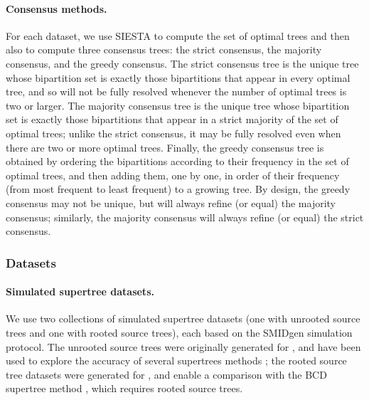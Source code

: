  


\paragraph{Consensus methods. }
For each dataset, we use SIESTA to compute the set of optimal trees and then also to compute three consensus trees: the strict consensus, the majority consensus, and the greedy consensus.
The strict consensus tree is the unique tree whose bipartition set is exactly those bipartitions that appear in every optimal tree, and so will not be fully resolved whenever the number of optimal trees is two or larger.
The majority consensus tree is the unique tree whose bipartition set is exactly those bipartitions that appear in a strict majority of the set of optimal trees; unlike the strict consensus, it may be fully resolved even when there are two or more optimal trees.
Finally, the greedy consensus tree is obtained by ordering the bipartitions according to their frequency in the set of optimal trees, and then adding them, one by one, in order of their frequency (from most frequent to least frequent) to a growing tree.
By design, the greedy consensus may not be unique, but will always refine (or equal) the majority consensus; similarly, the majority consensus will always refine (or equal) the strict consensus.  

\subsubsection{Datasets}

\paragraph{Simulated supertree datasets. }
We use two collections of
simulated supertree datasets (one with unrooted source trees and one with rooted source trees), 
each based on the SMIDgen \cite{smidgen} simulation protocol.
The unrooted source trees were  originally generated for \cite{smidgen}, and 
have 
  been used to explore the accuracy of several supertrees methods \cite{nguyen2012mrl,vachaspati2017fastrfs};
the rooted source tree datasets 
were generated for \cite{fleischauer2017bad}, and enable 
a comparison with the BCD supertree method \cite{fleischauer2017bad}, which requires rooted source trees.


